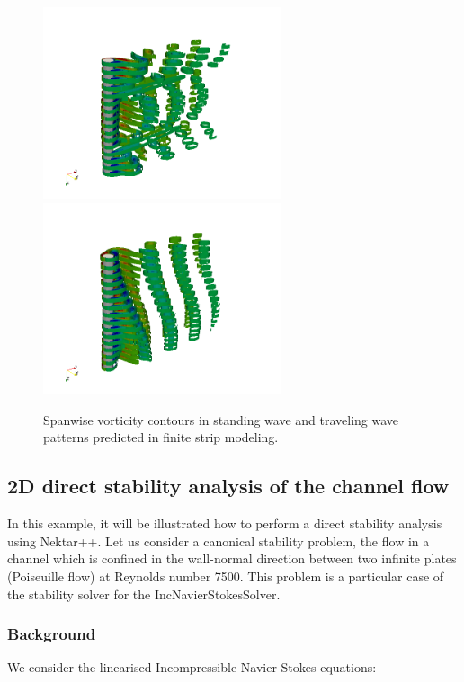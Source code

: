 \begin{figure}
\begin{center}
\includegraphics[width=7cm]{img/strip-16-time-100.png}
\includegraphics[width=7cm]{img/strip-16-time-600.png}
\caption{Spanwise vorticity contours in standing wave and traveling wave patterns predicted in finite strip modeling.}
\label{f:incns:finite-strip-modeling}
\end{center}
\end{figure}

 \subsection{2D direct stability analysis of the channel flow}

  In this example, it will be illustrated how to perform a direct stability analysis using Nektar++. Let us consider a canonical stability problem, the flow in a channel which is confined in the wall-normal direction between two infinite plates (Poiseuille flow) at Reynolds number 7500. This problem is a particular case of the stability solver for the IncNavierStokesSolver.

 \subsubsection{Background}

  We consider the linearised Incompressible Navier-Stokes equations:

